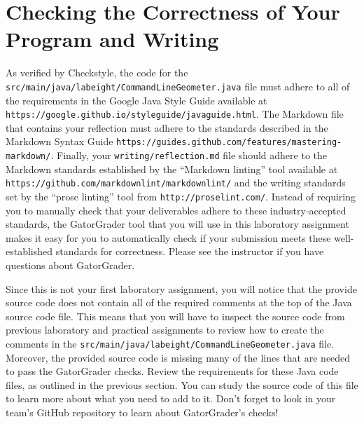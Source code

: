 \documentclass[11pt]{article}
\newcommand{\mainprogramsource}{\lstinline{src/main/java/labeight/CommandLineGeometer.java}}
\newcommand{\reflection}{\lstinline{writing/reflection.md}}
\newcommand{\url}[1]{\lstinline{#1}}
\newcommand{\step}[1]{``{#1}''}
\begin{document}
\section*{Checking the Correctness of Your Program and Writing}

As verified by Checkstyle, the code for the \mainprogramsource{} file must adhere to all of the requirements in the
Google Java Style Guide available at \url{https://google.github.io/styleguide/javaguide.html}. The Markdown file that
contains your reflection must adhere to the standards described in the Markdown Syntax Guide
\url{https://guides.github.com/features/mastering-markdown/}. Finally, your \reflection{} file should adhere to the
Markdown standards established by the \step{Markdown linting} tool available at
\url{https://github.com/markdownlint/markdownlint/} and the writing standards set by the \step{prose linting} tool from
\url{http://proselint.com/}. Instead of requiring you to manually check that your deliverables adhere to these
industry-accepted standards, the GatorGrader tool that you will use in this laboratory assignment makes it easy for you
to automatically check if your submission meets these well-established standards for correctness. Please see the
instructor if you have questions about GatorGrader.

Since this is not your first laboratory assignment, you will notice that the provide source code does not contain all of
the required comments at the top of the Java source code file. This means that you will have to inspect the source code
from previous laboratory and practical assignments to review how to create the comments in the \mainprogramsource{}
file. Moreover, the provided source code is missing many of the lines that are needed to pass the GatorGrader checks.
Review the requirements for these Java code files, as outlined in the previous section. You can study the source code of
this file to learn more about what you need to add to it. Don't forget to look in your team's GitHub repository to learn
about GatorGrader's checks!
\end{document}
